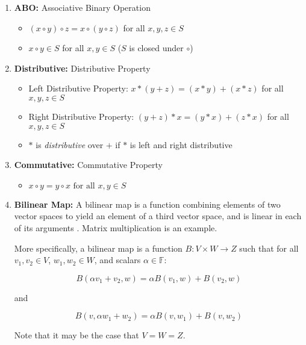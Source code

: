 \documentclass[11pt, oneside]{article}
\theoremstyle{definition}
\begin{document}
\begin{enumerate}
\item \textbf{ABO:} Associative Binary Operation 
\label{item:abo}
\begin{itemize}
\item $(x \circ y) \circ z = x \circ  (y \circ z)$  
      for all $x, y, z \in S$
\item $x \circ y \in S$ for all $x, y \in S$
      ($S$ is closed under $\circ$)
\end{itemize}

\item \textbf{Distributive:} Distributive Property 
\label{item:distributive}
\begin{itemize}
\item Left Distributive Property:  $x * (y+z )= (x*y) + (x*z)$ for
                                   all $x, y, z \in S$
\item Right Distributive Property: $(y + z) * x = (y*x) + (z*x)$
                                   for all $x, y, z \in S$
\item $*$ is \emph{distributive}   over $+$ if $*$ is left and 
                                   right distributive
\end{itemize}

\item \textbf{Commutative:} Commutative Property
\label{item:commutative}
\begin{itemize}
\item $x \circ y = y \circ x {\mbox{ for all }}x,y\in S$
\end{itemize}

\item \textbf{Bilinear Map:} 
\label{item:bilinear_map}
A bilinear map is a function combining elements of two vector
spaces to yield an element of a third vector space, and is linear
in each of its arguments \cite{wikipedia:bilinear_map}.  Matrix
multiplication is an example.

\bigskip
\noindent
More specifically, a bilinear map is a function \( B: V \times W
\to Z \) such that for all \( v_1, v_2 \in V \), \( w_1, w_2 \in
W \), and scalars \( \alpha \in \mathbb{F} \):

\begin{equation*}
   B(\alpha v_1 + v_2, w) = \alpha B(v_1, w) + B(v_2, w)
\end{equation*}

and

\vspace{-0.85em}
\begin{equation*}
   B(v, \alpha w_1 + w_2) = \alpha B(v, w_1) + B(v, w_2)
\end{equation*}

\bigskip
\noindent
Note that it may be the case that $V=W=Z$.
\end{enumerate}
\end{document}
